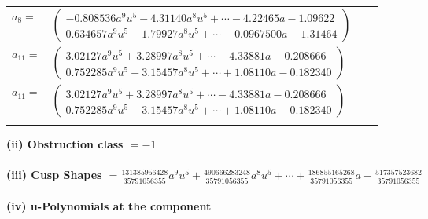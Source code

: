 \documentclass[1p]{elsarticle_modified}
\theoremstyle{definition}
\begin{document}
\begin{tabular}{m{7pt} m{180pt} m{7pt} m{180pt} }
\flushright $a_{8}=$&$\begin{pmatrix}-0.808536 a^{9} u^{5}-4.31140 a^{8} u^{5}+\cdots-4.22465 a-1.09622\\0.634657 a^{9} u^{5}+1.79927 a^{8} u^{5}+\cdots-0.0967500 a-1.31464\end{pmatrix}$ \\
\flushright $a_{11}=$&$\begin{pmatrix}3.02127 a^{9} u^{5}+3.28997 a^{8} u^{5}+\cdots-4.33881 a-0.208666\\0.752285 a^{9} u^{5}+3.15457 a^{8} u^{5}+\cdots+1.08110 a-0.182340\end{pmatrix}$\\ \flushright $a_{11}=$&$\begin{pmatrix}3.02127 a^{9} u^{5}+3.28997 a^{8} u^{5}+\cdots-4.33881 a-0.208666\\0.752285 a^{9} u^{5}+3.15457 a^{8} u^{5}+\cdots+1.08110 a-0.182340\end{pmatrix}$\\&\end{tabular}
\flushleft \textbf{(ii) Obstruction class $= -1$}\\~\\
\flushleft \textbf{(iii) Cusp Shapes $= \frac{131385956428}{35791056355} a^9 u^5+\frac{490666283248}{35791056355} a^8 u^5+\cdots+\frac{186855165268}{35791056355} a-\frac{517357523682}{35791056355}$}\\~\\
\newpage\renewcommand{\arraystretch}{1}
\flushleft \textbf{(iv) u-Polynomials at the component}\newline \\
\end{document}
